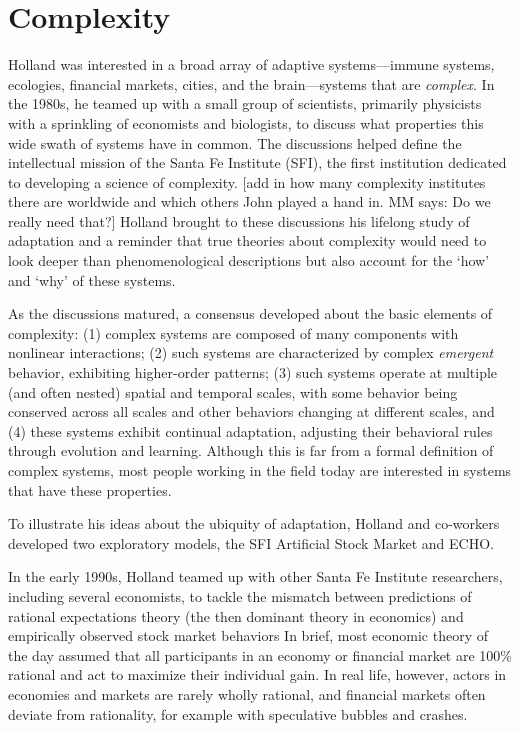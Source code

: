 \documentclass{sig-alternate}
\begin{document}
\section{Complexity}


Holland was interested in a broad array of adaptive systems---immune
systems, ecologies, financial markets, cities, and the brain---systems
that are \emph{complex}.  In the 1980s, he teamed up with a small
group of scientists, primarily physicists with a sprinkling of
economists and biologists, to discuss what properties this wide swath of systems
have in common.  The discussions helped define the intellectual mission
of the Santa Fe Institute (SFI), the first institution dedicated to
developing a science of complexity.  [add in how many complexity
  institutes there are worldwide and which others John played a hand
  in. MM says: Do we really need that?]  Holland brought to these discussions his lifelong study of
adaptation and a reminder that true theories about complexity would
need to look deeper than phenomenological descriptions but also
account for the `how' and `why' of these systems.

As the discussions matured, a consensus developed about the basic
elements of complexity: (1) complex systems are composed of many
components with nonlinear interactions; (2) such systems
are characterized by complex \emph{emergent} behavior, exhibiting
higher-order patterns; (3) such systems operate at multiple (and often
nested) spatial and temporal scales, with some behavior being
conserved across all scales and other behaviors changing at different
scales, and (4) these systems exhibit continual adaptation, adjusting
their behavioral rules through evolution and learning.  Although this
is far from a formal definition of complex systems, most people
working in the field today are interested in systems that have these
properties.

To illustrate his ideas about the ubiquity of adaptation, Holland and
co-workers developed two exploratory models, the SFI Artificial Stock
Market and ECHO.  

In the early 1990s, Holland teamed up with other Santa Fe Institute researchers,
including several economists, to tackle the mismatch between predictions
of rational expectations theory (the then dominant theory in economics) 
and empirically observed stock market behaviors 
In brief, most
economic theory of the day assumed that all participants in an economy
or financial market are 100\% rational and act to maximize their
individual gain.  In real life, however, actors in economies
and markets are rarely wholly rational, and financial markets often deviate
from rationality, for example with speculative bubbles and crashes.
\end{document}
